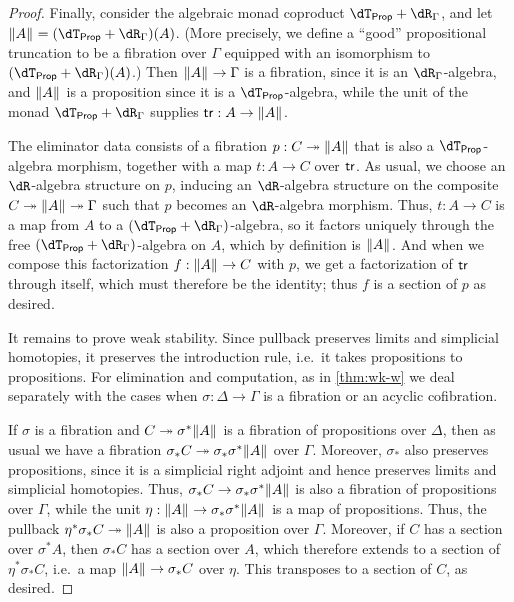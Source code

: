 \begin{enumerate}
\begin{proof}
  Finally, consider the algebraic monad coproduct $\dtprop + \dR_\Gamma$, and let $\brck A = (\dtprop+\dR_\Gamma)(A)$.
  (More precisely, we define a ``good'' propositional truncation to be a fibration over $\Gamma$ equipped with an isomorphism to $(\dtprop+\dR_\Gamma)(A)$.)
  Then $\mathopen{}\left\Vert A\right\Vert_{}\mathclose{} \to \Gamma$ is a fibration, since it is an $\dR_\Gamma$-algebra, and $\mathopen{}\left\Vert A\right\Vert_{}\mathclose{}$ is a proposition since it is a $\dtprop$-algebra, while the unit of the monad $\dtprop + \dR_\Gamma$ supplies $\mathsf{tr}:A\to\mathopen{}\left\Vert A\right\Vert_{}\mathclose{}$.

  The eliminator data consists of a fibration $p:C\twoheadrightarrow \mathopen{}\left\Vert A\right\Vert_{}\mathclose{}$ that is also a $\dtprop$-algebra morphism, together with a map $t:A\to C$ over $\mathsf{tr}$.
  As usual, we choose an $\dR$-algebra structure on $p$, inducing an $\dR$-algebra structure on the composite $C\twoheadrightarrow \mathopen{}\left\Vert A\right\Vert_{}\mathclose{} \twoheadrightarrow \Gamma$ such that $p$ becomes an $\dR$-algebra morphism.
  Thus, $t:A\to C$ is a map from $A$ to a $(\dtprop+\dR_\Gamma)$-algebra, so it factors uniquely through the free $(\dtprop+\dR_\Gamma)$-algebra on $A$, which by definition is $\mathopen{}\left\Vert A\right\Vert_{}\mathclose{}$.
  And when we compose this factorization $f:\mathopen{}\left\Vert A\right\Vert_{}\mathclose{} \to C$ with $p$, we get a factorization of $\mathsf{tr}$ through itself, which must therefore be the identity; thus $f$ is a section of $p$ as desired.

  It remains to prove weak stability.
  Since pullback preserves limits and simplicial homotopies, it preserves the introduction rule, i.e.\ it takes propositions to propositions.
  For elimination and computation, as in \cref{thm:wk-w} we deal separately with the cases when $\sigma:\Delta\to\Gamma$ is a fibration or an acyclic cofibration.

  If $\sigma$ is a fibration and $C\twoheadrightarrow \sigma^*\mathopen{}\left\Vert A\right\Vert_{}\mathclose{}$ is a fibration of propositions over $\Delta$, then as usual we have a fibration $\sigma_* C \twoheadrightarrow \sigma_* \sigma^* \mathopen{}\left\Vert A\right\Vert_{}\mathclose{}$ over $\Gamma$.
  Moreover, $\sigma_*$ also preserves propositions, since it is a simplicial right adjoint and hence preserves limits and simplicial homotopies.
  Thus, $\sigma_* C\to\sigma_*\sigma^*\mathopen{}\left\Vert A\right\Vert_{}\mathclose{}$ is also a fibration of propositions over $\Gamma$, while the unit $\eta : \mathopen{}\left\Vert A\right\Vert_{}\mathclose{} \to \sigma_* \sigma^* \mathopen{}\left\Vert A\right\Vert_{}\mathclose{}$ is a map of propositions.
  Thus, the pullback $\eta^* \sigma_* C \twoheadrightarrow \mathopen{}\left\Vert A\right\Vert_{}\mathclose{}$ is also a proposition over $\Gamma$.
  Moreover, if $C$ has a section over $\sigma^*A$, then $\sigma_* C$ has a section over $A$, which therefore extends to a section of $\eta^* \sigma_* C$, i.e.\ a map $\mathopen{}\left\Vert A\right\Vert_{}\mathclose{} \to \sigma_* C$ over $\eta$.
  This transposes to a section of $C$, as desired.


\end{proof}
\end{enumerate}
